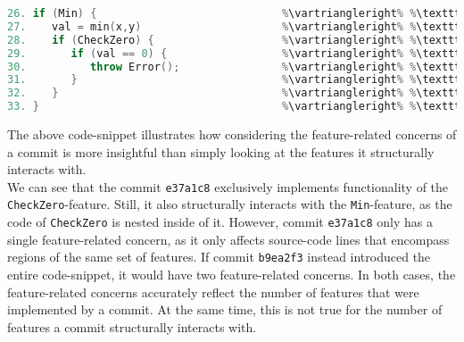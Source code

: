 \begin{lstlisting}[language=C++, caption={Example use-case for the feature-related concerns of a commit}]	
26. if (Min) {                             %\vartriangleright% %\texttt{b9ea2f3}%    %\vartriangleright% %Min%
27.    val = min(x,y)                      %\vartriangleright% %\texttt{b9ea2f3}%    %\vartriangleright% %Min%
28.    if (CheckZero) {                    %\vartriangleright% %\texttt{e37a1c8}%    %\vartriangleright% %Min% %\land% %CheckZero%
29.       if (val == 0) {                  %\vartriangleright% %\texttt{e37a1c8}%    %\vartriangleright% %Min% %\land% %CheckZero%
30.          throw Error();                %\vartriangleright% %\texttt{e37a1c8}%    %\vartriangleright% %Min% %\land% %CheckZero%
31.       }                                %\vartriangleright% %\texttt{e37a1c8}%    %\vartriangleright% %Min% %\land% %CheckZero%
32.    }                                   %\vartriangleright% %\texttt{e37a1c8}%    %\vartriangleright% %Min% %\land% %CheckZero%
33. }                                      %\vartriangleright% %\texttt{b9ea2f3}%    %\vartriangleright% %Min%
\end{lstlisting}
\label{lst:commit_concerns}
\textsf{The above code-snippet illustrates how considering the feature-related concerns of a commit is more insightful than simply looking at the features it structurally interacts with. \\ 
We can see that the commit \texttt{e37a1c8} exclusively implements functionality of the \texttt{CheckZero}-feature. 
Still, it also structurally interacts with the \texttt{Min}-feature, as the code of \texttt{CheckZero} is nested inside of it. 
However, commit \texttt{e37a1c8} only has a single feature-related concern, as it only affects source-code lines that encompass regions of the same set of features.
If commit \texttt{b9ea2f3} instead introduced the entire code-snippet, it would have two feature-related concerns.
In both cases, the feature-related concerns accurately reflect the number of features that were implemented by a commit.
At the same time, this is not true for the number of features a commit structurally interacts with.}

